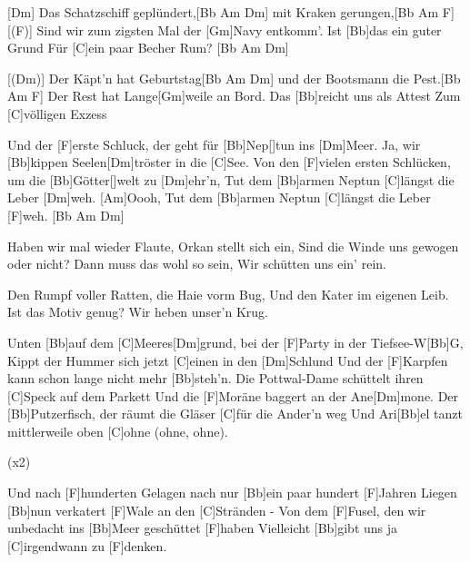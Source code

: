 

\begin{guitar}
	[Dm] Das Schatzschiff geplündert,[Bb Am Dm] mit Kraken gerungen,[Bb Am F]{}
	[(F)] Sind wir zum zigsten Mal der [Gm]Navy entkomm'. Ist [Bb]das ein guter Grund 
	Für [C]ein paar Becher Rum? [Bb Am Dm]{}
	
	[(Dm)] Der Käpt'n hat Geburtstag[Bb Am Dm] und der Bootsmann die Pest.[Bb Am F]{}
	Der Rest hat Lange[Gm]weile an Bord. Das [Bb]reicht uns als Attest
	Zum [C]völligen Exzess
	
	Und der [F]erste Schluck, der geht für [Bb]Nep[]tun ins [Dm]Meer.
	Ja, wir [Bb]kippen Seelen[Dm]tröster in die [C]See.
	Von den [F]vielen ersten Schlücken, um die [Bb]Götter[]welt zu [Dm]ehr'n,
	Tut dem [Bb]armen Neptun [C]längst die Leber [Dm]weh. [Am]Oooh,
	Tut dem [Bb]armen Neptun [C]längst die Leber [F]weh. [Bb Am Dm]{}
	
	Haben wir mal wieder Flaute, Orkan stellt sich ein,
	Sind die Winde uns gewogen oder nicht? Dann muss das wohl so sein,
	Wir schütten uns ein' rein.
	
	Den Rumpf voller Ratten, die Haie vorm Bug,
	Und den Kater im eigenen Leib. Ist das Motiv genug?
	Wir heben unser'n Krug.
	
	 
	\pagebreak
	Unten [Bb]auf dem [C]Meeres[Dm]grund, bei der [F]Party in der Tiefsee-W[Bb]G,
	Kippt der Hummer sich jetzt [C]einen in den [Dm]Schlund
	Und der [F]Karpfen kann schon lange nicht mehr [Bb]steh'n.
	Die Pottwal-Dame schüttelt ihren [C]Speck auf dem Parkett
	Und die [F]Moräne baggert an der Ane[Dm]mone.
	Der [Bb]Putzerfisch, der räumt die Gläser [C]für die Ander'n weg
	Und Ari[Bb]el tanzt mittlerweile oben [C]ohne (ohne, ohne).
	
	  (x2)
	
	Und nach [F]hunderten Gelagen nach nur [Bb]ein paar hundert [F]Jahren
	Liegen [Bb]nun verkatert [F]Wale an den [C]Stränden - 
	Von dem [F]Fusel, den wir unbedacht ins [Bb]Meer geschüttet [F]haben
	Vielleicht [Bb]gibt uns ja [C]irgendwann zu [F]denken.
\end{guitar}